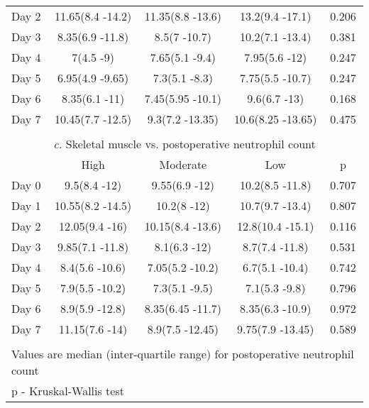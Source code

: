 \begin{table}[p]
\begin{tabular}{|l c c c c |}
		Day 2 & 11.65(8.4 -14.2) & 11.35(8.8 -13.6)  & 13.2(9.4 -17.1)   & 0.206                        \\
		Day 3 & 8.35(6.9 -11.8)  & 8.5(7 -10.7)      & 10.2(7.1 -13.4)   & 0.381                        \\
		Day 4 & 7(4.5 -9)        & 7.65(5.1 -9.4)    & 7.95(5.6 -12)     & 0.247                        \\
		Day 5 & 6.95(4.9 -9.65)  & 7.3(5.1 -8.3)     & 7.75(5.5 -10.7)   & 0.247                        \\
		Day 6 & 8.35(6.1 -11)    & 7.45(5.95 -10.1)  & 9.6(6.7 -13)      & 0.168                        \\
		Day 7 & 10.45(7.7 -12.5) & 9.3(7.2 -13.35)   & 10.6(8.25 -13.65) & 0.475                        \\ \hline
		                                     \multicolumn{5}{c}{}                                       \\
		      \multicolumn{5}{c}{\textit{c.} Skeletal muscle vs. postoperative neutrophil count}        \\ \hline
		      & High             & Moderate          & Low               & p                            \\
		Day 0 & 9.5(8.4 -12)     & 9.55(6.9 -12)     & 10.2(8.5 -11.8)   & 0.707                        \\
		Day 1 & 10.55(8.2 -14.5) & 10.2(8 -12)       & 10.7(9.7 -13.4)   & 0.807                        \\
		Day 2 & 12.05(9.4 -16)   & 10.15(8.4 -13.6)  & 12.8(10.4 -15.1)  & 0.116                        \\
		Day 3 & 9.85(7.1 -11.8)  & 8.1(6.3 -12)      & 8.7(7.4 -11.8)    & 0.531                        \\
		Day 4 & 8.4(5.6 -10.6)   & 7.05(5.2 -10.2)   & 6.7(5.1 -10.4)    & 0.742                        \\
		Day 5 & 7.9(5.5 -10.2)   & 7.3(5.1 -9.5)     & 7.1(5.3 -9.8)     & 0.796                        \\
		Day 6 & 8.9(5.9 -12.8)   & 8.35(6.45 -11.7)  & 8.35(6.3 -10.9)   & 0.972                        \\
		Day 7 & 11.15(7.6 -14)   & 8.9(7.5 -12.45)   & 9.75(7.9 -13.45)  & 0.589                        \\ \hline
		                                     \multicolumn{5}{c}{}                                       \\
		\multicolumn{5}{l}{Values are median (inter-quartile range) for postoperative neutrophil count} \\
		\multicolumn{5}{l}{p - Kruskal-Wallis test}
	\end{tabular}	
\end{table}







